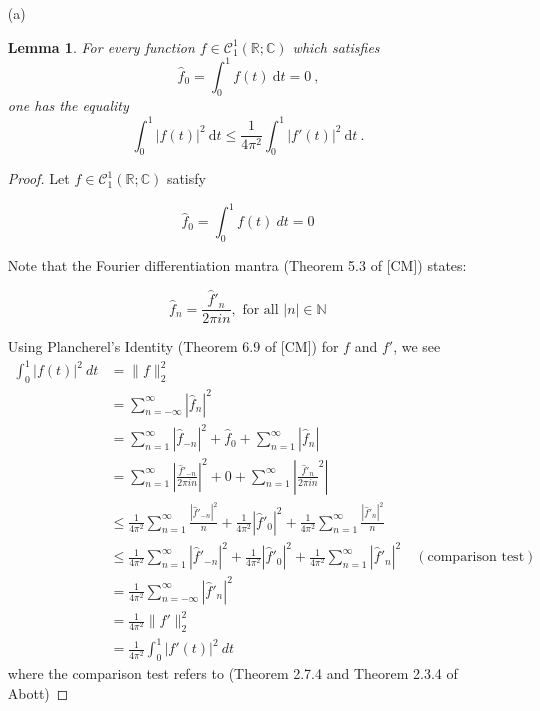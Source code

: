 \documentclass[12pt, reqno]{article}
\newtheorem{lemma}[theorem]{Lemma}
\theoremstyle{definition}
\theoremstyle{remark}
\newcommand{\ud}{\mathrm{d}}
\begin{document}

\begin{itemize}
\item[(a)] 

\begin{lemma} \label{two_a}
For every function $f\in\mathcal{C}_1^1(\mathbb{R;C})$ which satisfies \[
\widehat{f}_0 = \int_0^1 f(t) ~\ud t = 0 ~\mbox{,}
\]
one has the equality
\begin{equation} 
\int_0^1 \vert f(t) \vert^2 ~\ud t \leq \dfrac{1}{4 \pi^2} \int_0^1 \vert f'(t) \vert^2 ~\ud t ~\mbox{.}
\end{equation}
\end{lemma}

\begin{proof}
    Let $f\in\mathcal{C}_{1}^{1}(\mathbb{R};\mathbb{C})$ satisfy 
    
    \[
        \hat f_{0}=\int_{0}^{1}f(t)\ dt=0
    \]

    Note that the Fourier differentiation mantra (Theorem 5.3 of [CM]) states: 
    
    \[\hat f_{n}= \frac{\hat f'_{n}}{2\pi in},\text{ for all }|n|\in \mathbb{N}
    \]
    
    Using Plancherel's Identity (Theorem 6.9 of [CM]) for $f$ and $f'$, we see 
    \begin{align*}
        \int_{0}^{1}|f(t)|^{2}\ dt&= \|f\|_{2}^{2}\\
        &= \sum_{n=-\infty}^{\infty}\left|\hat f_{n}\right|^{2}\\
        &= \sum_{n=1}^{\infty}\left|\hat f_{-n}\right|^{2}+\hat f_{0}+\sum_{n=1}^{\infty}\left|\hat f_{n}\right|\\
        &= \sum_{n=1}^{\infty}\left|\frac{\hat f'_{-n}}{2\pi in}\right|^{2}+0+\sum_{n=1}^{\infty}\left|\frac{\hat f'_{n}}{2\pi in}^{2}\right|\\
        &\le \frac{1}{4\pi^{2}}\sum_{n=1}^{\infty}\frac{\left|\hat f'_{-n}\right|^{2}}{n}+ \frac{1}{4\pi^{2}}\left|\hat f'_{0}\right|^{2}+ \frac{1}{4\pi^{2}}\sum_{n=1}^{\infty}\frac{\left|\hat f'_{n}\right|^{2}}{n}\\
        &\le \frac{1}{4\pi^{2}}\sum_{n=1}^{\infty}\left|\hat f'_{-n}\right|^{2}+ \frac{1}{4\pi^{2}}\left|\hat f'_{0}\right|^{2}+ \frac{1}{4\pi^{2}}\sum_{n=1}^{\infty}\left|\hat f'_{n}\right|^{2}\quad(\text{comparison test})\\
        &= \frac{1}{4\pi^{2}}\sum_{n=-\infty}^{\infty}\left|\hat f'_{n}\right|^{2}\\
        &= \frac{1}{4\pi^{2}}\|f'\|_{2}^{2}\\
        &= \frac{1}{4\pi^{2}}\int_{0}^{1}|f'(t)|^2\ dt
    \end{align*}
    where the comparison test refers to (Theorem 2.7.4 and Theorem 2.3.4 of Abott)
\end{proof}



\end{itemize}
\end{document}
